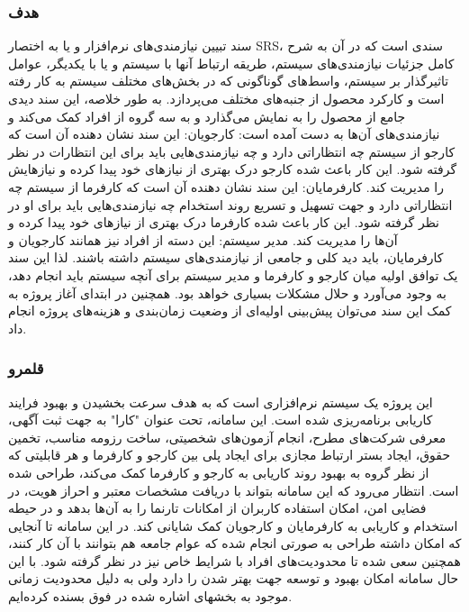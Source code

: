 \documentclass[12pt]{article}
\begin{document}
	\subsubsection{هدف}
	سند تبیین نیازمندی‌های نرم‌افزار و یا به اختصار SRS، سندی است که در آن به شرح کامل جزئیات نیازمندی‌های سیستم، طریقه ارتباط آنها با سیستم و یا با یکدیگر، عوامل تاثیرگذار بر سیستم، واسط‌های گوناگونی که در بخش‌های مختلف سیستم به کار رفته است و کارکرد محصول از جنبه‌های مختلف می‌پردازد.
	به طور خلاصه، این سند دیدی جامع از محصول را به نمایش می‌گذارد و به سه گروه از افراد کمک می‌کند و نیازمندی‌های آن‌ها به دست آمده است:
	کارجویان: این سند نشان‌ دهنده آن است که کارجو از سیستم چه انتظاراتی دارد و چه نیازمندی‌هایی باید برای این انتظارات در نظر گرفته شود. این کار باعث شده کارجو درک بهتری از نیازهای خود پیدا کرده و نیازهایش را مدیریت کند.
	کارفرمایان: این سند نشان دهنده آن است که کارفرما از سیستم چه انتظاراتی دارد و جهت تسهیل و تسریع روند استخدام چه نیازمندی‌هایی باید برای او در نظر گرفته شود. این کار باعث شده کارفرما درک بهتری از نیاز‌های خود پیدا کرده و آن‌ها را مدیریت کند.
	مدیر سیستم:  این دسته از افراد نیز همانند کارجویان و کارفرمایان، باید دید کلی و جامعی از نیازمندی‌های سیستم داشته باشند. لذا این سند یک توافق اولیه میان کارجو و کارفرما و مدیر سیستم برای آنچه سیستم باید انجام دهد، به وجود می‌آورد و حلال مشکلات بسیاری خواهد بود.
	همچنین در ابتدای آغاز پروژه به کمک این سند می‌توان پیش‌بینی اولیه‌ای از وضعیت زمان‌بندی و هزینه‌های پروژه انجام داد.

	\subsubsection{قلمرو}
	 این پروژه یک سیستم نرم‌افزاری است که به هدف سرعت بخشیدن و بهبود فرایند کاریابی برنامه‌ریزی شده است.
	این سامانه، تحت عنوان "کارا" به جهت ثبت آگهی، معرفی شرکت‌های مطرح، انجام آزمون‌های شخصیتی، ساخت رزومه مناسب، تخمین حقوق، ایجاد بستر ارتباط مجازی برای ایجاد پلی بین کارجو و کارفرما و هر قابلیتی که از نظر گروه به بهبود روند کاریابی به کارجو و کارفرما کمک می‌کند، طراحی شده است.
	انتظار می‌رود که این سامانه بتواند با دریافت مشخصات معتبر و احراز هویت، در فضایی امن، امکان استفاده کاربران از امکانات تارنما را به آن‌ها بدهد و در حیطه استخدام و کاریابی به کارفرمایان و کارجویان کمک شایانی کند.
	در این سامانه تا آنجایی که امکان داشته طراحی به صورتی انجام شده که عوام جامعه هم بتوانند با آن کار کنند، همچنین سعی شده تا محدودیت‌های افراد با شرایط خاص نیز در نظر گرفته شود. با این حال سامانه امکان بهبود و توسعه جهت بهتر شدن را دارد ولی به دلیل محدودیت زمانی موجود به بخشهای اشاره شده در فوق بسنده کرده‌ایم.
\end{document}
